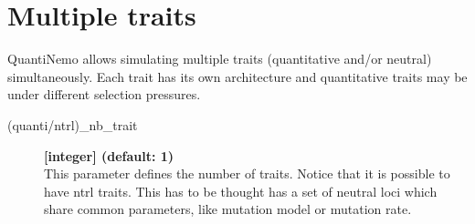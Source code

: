 \documentclass[letterpaper,12pt,oneside]{book}
\begin{document}
\section{Multiple traits}\label{sec:MultipleTraits}
QuantiNemo allows simulating multiple traits (quantitative and/or neutral) simultaneously. Each trait has its own architecture and quantitative traits may be under different selection pressures.

\begin{description}
\item[(quanti/ntrl)\_nb\_trait] \textbf{[integer] (default: 1)}\\
This parameter defines the number of traits. Notice that it is possible to have ntrl traits. This has to be thought has a set of neutral loci which share common parameters, like mutation model or mutation rate. 
\end{description}
\end{document}
